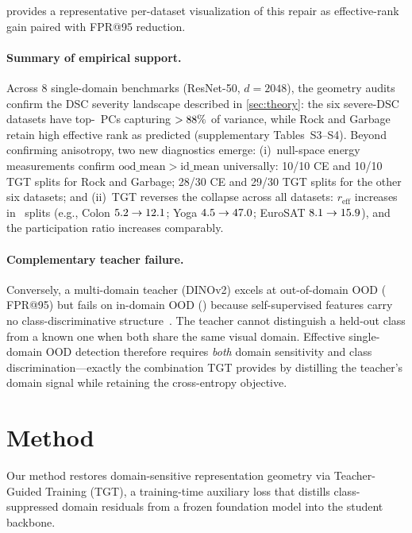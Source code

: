 \documentclass[runningheads]{llncs}
\begin{document}
 provides a representative per-dataset visualization of this repair as effective-rank gain paired with FPR@95 reduction.

\paragraph{Summary of empirical support.}
Across 8 single-domain benchmarks (ResNet-50, $d{=}2048$), the geometry audits confirm the DSC severity landscape described in \cref{sec:theory}: the six severe-DSC datasets have top-\DSCTopPCCount\ PCs capturing $>88\%$ of variance, while Rock and Garbage retain high effective rank as predicted (supplementary Tables~S3--S4).
Beyond confirming anisotropy, two new diagnostics emerge:
(i)~null-space energy measurements confirm $\mathrm{ood\_mean} > \mathrm{id\_mean}$ universally: 10/10 CE and 10/10 TGT splits for Rock and Garbage; 28/30 CE and 29/30 TGT splits for the other six datasets;
and (ii)~TGT reverses the collapse across all datasets: $r_{\mathrm{eff}}$ increases in \DSCReffIncreaseSplits\ splits (e.g., Colon $5.2 \to 12.1$; Yoga $4.5 \to 47.0$; EuroSAT $8.1 \to 15.9$), and the participation ratio increases comparably.

\paragraph{Complementary teacher failure.}
Conversely, a multi-domain teacher (DINOv2) excels at out-of-domain OOD (\TeacherOnlyFaroodFPR{} FPR@95) but fails on in-domain OOD (\TeacherOnlyNearoodFPR{}) because self-supervised features carry no class-discriminative structure~\cite{yangcan}.
The teacher cannot distinguish a held-out class from a known one when both share the same visual domain.
Effective single-domain OOD detection therefore requires \emph{both} domain sensitivity and class discrimination---exactly the combination TGT provides by distilling the teacher's domain signal while retaining the cross-entropy objective.


\section{Method}
\label{sec:method}

Our method restores domain-sensitive representation geometry via Teacher-Guided Training (TGT), a training-time auxiliary loss that distills class-suppressed domain residuals from a frozen foundation model into the student backbone.
\end{document}
